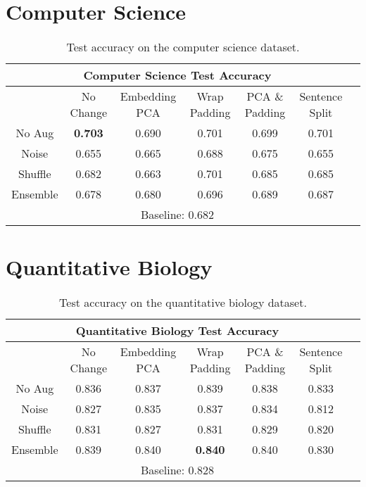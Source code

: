 \section{Computer Science}
\begin{center}
  \begin{table}[H]
 \begin{tabular}{|c||c|c|c|c|c|c|}
  \hline
  \multicolumn{6}{|c|}{\textbf{Computer Science Test Accuracy}}\\ \hline
   & No Change & Embedding PCA & Wrap Padding & PCA \& Padding & Sentence Split\\  \hline
   No Aug & \textbf{0.703} & 0.690 & 0.701 & 0.699 & 0.701 \\      \hline
   Noise & 0.655 & 0.665 & 0.688 & 0.675 &  0.655 \\      \hline
   Shuffle & 0.682 & 0.663 & 0.701 & 0.685 & 0.685 \\  \hline
   Ensemble & 0.678 & 0.680 & 0.696 & 0.689 & 0.687 \\      \hline
   \multicolumn{6}{|c|}{Baseline: 0.682}\\ \hline
 \end{tabular}
 \caption{Test accuracy on the computer science dataset.}
 \end{table}
\end{center}

\section{Quantitative Biology}
\begin{center}
  \begin{table}[H]
\begin{tabular}{|c||c|c|c|c|c|c|}
  \hline
\multicolumn{6}{|c|}{\textbf{Quantitative Biology Test Accuracy}}\\ \hline
  & No Change & Embedding PCA & Wrap Padding & PCA \& Padding & Sentence Split\\  \hline
  No Aug & 0.836 & 0.837 & 0.839 & 0.838 & 0.833 \\      \hline
  Noise & 0.827 & 0.835 & 0.837 & 0.834 & 0.812  \\      \hline
  Shuffle & 0.831 & 0.827 & 0.831 & 0.829 & 0.820 \\      \hline
  Ensemble & 0.839 & 0.840 & \textbf{0.840} & 0.840 & 0.830 \\      \hline
  \multicolumn{6}{|c|}{Baseline: 0.828}\\ \hline
\end{tabular}
\caption{Test accuracy on the quantitative biology dataset.}
\end{table}
\end{center}
